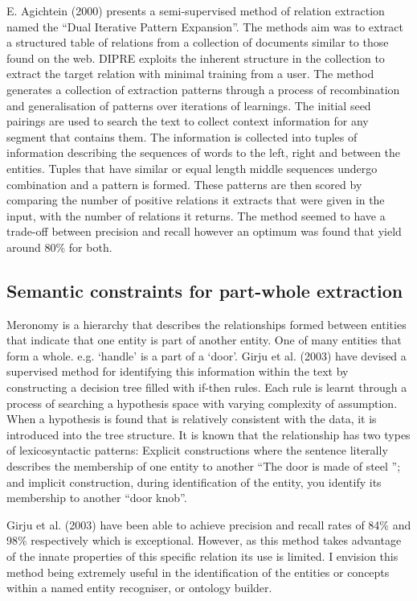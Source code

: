 \documentclass[11pt]{article} %
\begin{document}
E. Agichtein (2000) presents a semi-supervised method of relation extraction named the “Dual Iterative Pattern Expansion”. The methods aim was to extract a structured table of relations from a collection of documents similar to those found on the web. DIPRE exploits the inherent structure in the collection to extract the target relation with minimal training from a user. The method generates a collection of extraction patterns through a process of recombination and generalisation of patterns over iterations of learnings. The initial seed pairings are used to search the text to collect context information for any segment that contains them. The information is collected into tuples of information describing the sequences of words to the left, right and between the entities. Tuples that have similar or equal length middle sequences undergo combination and a pattern is formed. These patterns are then scored by comparing the number of positive relations it extracts that were given in the input, with the number of relations it returns. The method seemed to have a trade-off between precision and recall however an optimum was found that yield around 80\% for both.

\subsection{Semantic constraints for part-whole extraction}

Meronomy is a hierarchy that describes the relationships formed between entities that indicate that one entity is part of another entity. One of many entities that form a whole. e.g. ‘handle’ is a part of a ‘door’. Girju et al. (2003) have devised a supervised method for identifying this information within the text by constructing a decision tree filled with if-then rules. Each rule is learnt through a process of searching a hypothesis space with varying complexity of assumption. When a hypothesis is found that is relatively consistent with the data, it is introduced into the tree structure. It is known that the relationship has two types of lexicosyntactic patterns: Explicit constructions where the sentence literally describes the membership of one entity to another “The door is made of steel ”; and implicit construction, during identification of the entity, you identify its membership to another “door knob”. 

Girju et al. (2003) have been able to achieve precision and recall rates of 84\% and 98\% respectively which is exceptional. However, as this method takes advantage of the innate properties of this specific relation its use is limited. I envision this method being extremely useful in the identification of the entities or concepts within a named entity recogniser, or ontology builder.
\end{document}
